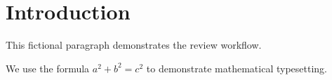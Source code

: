 \section{Introduction}
This fictional paragraph demonstrates the review workflow.

We use the formula $a^2+b^2=c^2$ to demonstrate mathematical typesetting.
